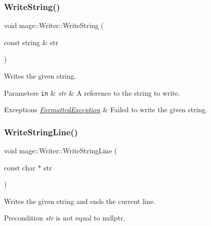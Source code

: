 \subsubsection{\texorpdfstring{Write\+String()}{WriteString()}\hspace{0.1cm}{\footnotesize\ttfamily [2/2]}}
{\footnotesize\ttfamily void mage\+::\+Writer\+::\+Write\+String (\begin{DoxyParamCaption}\item[{const string \&}]{str }\end{DoxyParamCaption})\hspace{0.3cm}{\ttfamily [protected]}}

Writes the given string.


\begin{DoxyParams}[1]{Parameters}
\mbox{\tt in}  & {\em str} & A reference to the string to write. \\
\hline
\end{DoxyParams}

\begin{DoxyExceptions}{Exceptions}
{\em \hyperlink{structmage_1_1_formatted_exception}{Formatted\+Exception}} & Failed to write the given string. \\
\hline
\end{DoxyExceptions}
\hypertarget{classmage_1_1_writer_ad53f69e0f722c4d4b8b320ea39770c1a}{}\label{classmage_1_1_writer_ad53f69e0f722c4d4b8b320ea39770c1a} 
\subsubsection{\texorpdfstring{Write\+String\+Line()}{WriteStringLine()}\hspace{0.1cm}{\footnotesize\ttfamily [1/2]}}
{\footnotesize\ttfamily void mage\+::\+Writer\+::\+Write\+String\+Line (\begin{DoxyParamCaption}\item[{const char $\ast$}]{str }\end{DoxyParamCaption})\hspace{0.3cm}{\ttfamily [protected]}}

Writes the given string and ends the current line.

\begin{DoxyPrecond}{Precondition}
{\itshape str} is not equal to {\ttfamily nullptr}. 
\end{DoxyPrecond}

